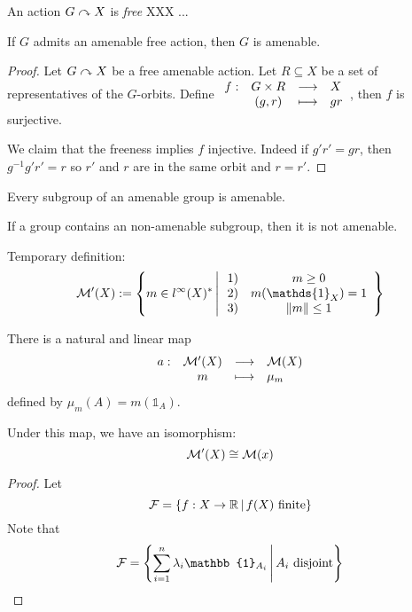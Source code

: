     \begin{definition}
        An action $G \curvearrowright X$ is \emph{free} 
        XXX ... 
    \end{definition}

    \begin{proposition}
        If $G$ admits an amenable free action, then $G$ is amenable.
    \end{proposition}
    \begin{proof}
        Let $G \curvearrowright X$ be a free amenable action.
        Let $R \subseteq X$ be a set of representatives of the $G$-orbits.
        Define $\begin{array}{rccl} f : & G\times R & \longrightarrow & X \\ & (g, r) & \longmapsto & gr \end{array}$, then $f$ is surjective.

        We claim that the freeness implies $f$ injective.
        Indeed if $g'r' = gr$, then $g^{-1}g'r' = r$
        so $r'$ and $r$ are in the same orbit and $r = r'$.
    \end{proof}

    \begin{corollary}
        Every subgroup of an amenable group is amenable.
    \end{corollary}

    \begin{corollary}
        If a group contains an non-amenable subgroup, then
        it is not amenable.
    \end{corollary}

    Temporary definition:
    \[
        \Mm'(X) := \setst{
            m \in l^\infty(X)^*
        }{
            \begin{array}{rc}
                1) & m \geq 0 \\
                2) & m(\mathds{1}_X) = 1 \\
                3) & \norm{m} \leq 1
            \end{array}
        }
    \]

    There is a natural and linear map \[ 
        \begin{array}{rccl} a : & \mathcal{M}'(X) & \longrightarrow & \mathcal{M}(X) \\ & m & \longmapsto & \mu_m \end{array}
    \]
    defined by $\mu_m(A) = m(\mathbb{1}_A)$.

    \begin{theorem}
        Under this map, we have an isomorphism:
        \[
            \mathcal{M}'(X) \cong \mathcal{M}(x)
        \]
    \end{theorem}

    \begin{proof}
        Let \[
            \mathcal{F} = \left\{  f: X \to \mathbb R \, \middle| \,  f(X) \text{ finite} \right\}
        \]
        Note that \[
            \Ff = \setst{ \sum_{i = 1}^n \lambda_i \mathbb{1}_{A_i} }
                { A_i \text{ disjoint}}
        \]

    \end{proof}
    
